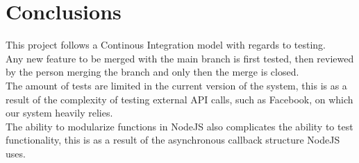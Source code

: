\documentclass{article}
\begin{document}
\section{Conclusions}
This project follows a Continous Integration model with regards to testing. \\ Any new feature to be merged with the main branch is first tested, then reviewed by the person merging the branch and only then the merge is closed.\\
The amount of tests are limited in the current version of the system, this is as a result of the complexity of testing external API calls, such as Facebook, on which our system heavily relies.\\
The ability to modularize functions in NodeJS also complicates the ability to test functionality, this is as a result of the asynchronous callback structure NodeJS uses.
\end{document}

